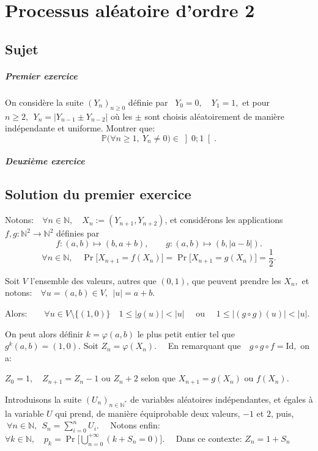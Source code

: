 \chapter{Processus aléatoire d'ordre 2}

\section{Sujet}

\paragraph{Premier exercice }
On considère la suite $(Y_n)_{n\geqslant 0}$ définie par $\;\: Y_0 =0,\quad Y_1=1,$ et pour $ n\geqslant 2, \:\: Y_n = \vert Y_{n-1} \pm Y_{n-2}\vert$ où les $\pm$ sont choisis aléatoirement de manière indépendante et uniforme. Montrer que:
$$ \mathbb P\big( \forall n \geqslant 1, \: Y_n \neq 0 \big) \in \left]0;1\right[.$$

\paragraph {Deuxième exercice }

\section{Solution du premier exercice}  %
Notons:$\quad\forall n \in \mathbb N  ,\quad X_n := (Y_{n+1},Y_{n+2})$, et considérons les applications $f,g: \mathbb N^2 \to \mathbb N^2$ définies par 
 $$ f:(a,b)\mapsto (b,a+b), \qquad g:(a,b) \mapsto (b,|a-b|).$$
 $$\forall n \in \mathbb N,\quad \Pr\big[X_{n+1} = f(X_n)\big] =\Pr \big[X_{n+1} = g(X_n)\big] = \dfrac12.$$
  
  Soit $V$ l'ensemble des valeurs, autres que $(0,1)$, que peuvent prendre les $X_n,$ et notons:$\quad\forall u = (a,b)\in V,\:\: |u| = a+b.$
  

 
  
  Alors:$\qquad\forall u \in V \setminus\{(1,0)\}\quad1\leqslant |g(u)|< |u|\quad$ ou $\quad 1\leqslant  |(g\circ g)(u)| < |u|.$
  
  On peut alors définir $ k= \varphi(a,b)$  le plus petit entier tel que $g^k (a,b) =(1,0).$  Soit $Z_n = \varphi (X_n).\quad$ En remarquant que $\:\:\:g\circ g\circ f =\text{Id},$ on a:
  
  $Z_0 =1,\quad Z_{n+1} = Z_n-1$ ou $Z_n +2$ selon que $X_{n+1}= g(X_n)$ ou $ f(X_n).$
  
  Introduisons la suite $(U_n)_{n\in \mathbb N^*}$ de variables aléatoires indépendantes, et égales à la variable $U$ qui prend, de manière équiprobable deux valeurs, $-1$ et $2$, puis, 
  $\:\forall n \in \mathbb N, \:\: S_n = \displaystyle \sum _{i=0}^n U_i.\quad$
  Notons enfin: $\forall k \in \mathbb N,\quad p_k= \displaystyle \Pr \Big[\bigcup_{n=0}^{+\infty} (k + S_n =0)\Big].\quad$ Dans ce contexte: $Z_n= 1+S_n$
  
